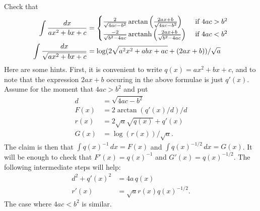 \documentclass[a4paper]{book}
\theoremstyle{definition}
\newenvironment{starex}{
 \renewcommand{\thetheorem}{\arabic{chapter}.\arabic{section}.\arabic{theorem}${}^*$}
 \exercise
}{\endexercise}
\begin{document}
\begin{starex}
 Check that
 \begin{align*}
  \int \frac{dx}{ax^2+bx+c} &= 
   \begin{cases} \frac{2}{\sqrt{4ac-b^2}}
                 \arctan\left(\frac{2ax+b}{\sqrt{4ac-b^2}}\right) &
                  \text{ if } 4ac > b^2 \\
                 \frac{-2}{\sqrt{b^2-4ac}}
                 \operatorname{arctanh}\left(\frac{2ax+b}{\sqrt{b^2-4ac}}\right) &
                  \text{ if } 4ac < b^2
   \end{cases} \\
  \int \frac{dx}{\sqrt{ax^2+bx+c}} &=
   \log(2\sqrt{a^2x^2+abx+ac}+(2ax+b))/\sqrt{a}
 \end{align*}
 Here are some hints.  First, it is convenient to write
 $q(x)=ax^2+bx+c$, and to note that the expression $2ax+b$ occuring in
 the above formulae is just $q'(x)$.  Assume for the moment that
 $4ac>b^2$ and put 
 \begin{align*}
  d    &= \sqrt{4ac-b^2} \\
  F(x) &= 2\arctan(q'(x)/d)/d \\
  r(x) &= 2\sqrt{a}\sqrt{q(x)}+q'(x) \\
  G(x) &= \log(r(x))/\sqrt{a}.
 \end{align*}
 The claim is then that $\int q(x)^{-1}\,dx=F(x)$ and
 $\int q(x)^{-1/2}\,dx=G(x)$.  It will be enough to check that
 $F'(x)=q(x)^{-1}$ and $G'(x)=q(x)^{-1/2}$.  The following
 intermediate steps will help:
 \begin{align*}
  d^2+q'(x)^2 &= 4a\,q(x) \\
  r'(x) &= \sqrt{a}r(x)q(x)^{-1/2}.
 \end{align*}
 The case where $4ac<b^2$ is similar.
\end{starex}
\end{document}

